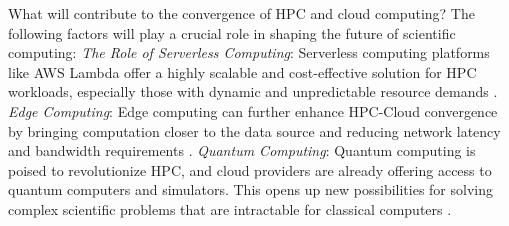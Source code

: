     What will contribute to the convergence of HPC and cloud computing? The following factors will play a crucial role in shaping the future of scientific computing:
    \newline
    \newline
    \noindent
    \textit{The Role of Serverless Computing}: Serverless computing platforms like AWS Lambda offer a highly scalable and cost-effective solution for HPC workloads, especially those with dynamic and unpredictable resource demands \cite{copik_rfaas_2023, petrosyan_serverless_2022, chahal_isesa_2022}.
    \newline
    \newline
    \noindent
    \textit{Edge Computing}: Edge computing can further enhance HPC-Cloud convergence by bringing computation closer to the data source and reducing network latency and bandwidth requirements \cite{greneche_methodology_2022, kuity_investigating_2023, guo_understanding_2023, endo_consideration_2022}.
     \newline
     \newline
    \noindent
     \textit{Quantum Computing}: Quantum computing is poised to revolutionize HPC, and cloud providers are already offering access to quantum computers and simulators. This opens up new possibilities for solving complex scientific problems that are intractable for classical computers \cite{michalewicz_attempt_2023, ruhela_characterizing_2021}.
